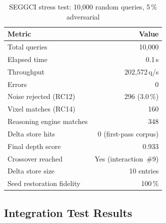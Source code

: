 \documentclass[12pt,a4paper]{article}
\theoremstyle{plain}
\theoremstyle{definition}
\theoremstyle{remark}
\begin{document}
\begin{table}[H]
\centering
\caption{SEGGCI stress test: 10{,}000 random queries, 5\,\% adversarial}
\label{tab:stress}
\renewcommand{\arraystretch}{1.2}
\begin{tabular}{lr}
\toprule
\textbf{Metric} & \textbf{Value} \\
\midrule
Total queries              & 10{,}000 \\
Elapsed time               & 0.1\,s \\
Throughput                 & 202{,}572\,q/s \\
Errors                     & 0 \\
Noise rejected (RC12)      & 296 (3.0\,\%) \\
Vixel matches (RC14)       & 160 \\
Reasoning engine matches   & 348 \\
Delta store hits           & 0 (first-pass corpus) \\
Final depth score          & 0.933 \\
Crossover reached          & Yes (interaction~\#9) \\
Delta store size           & 10 entries \\
Seed restoration fidelity  & 100\,\% \\
\bottomrule
\end{tabular}
\end{table}

\subsection{Integration Test Results}
\end{document}
